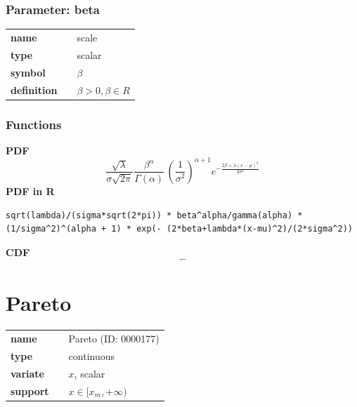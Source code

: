 \documentclass{article}
\begin{document}
\subsubsection*{Parameter: beta}

\noindent\begin{tabular}{p{2cm}cl}
\textbf{name} & & scale \\
\textbf{type} & & scalar \\
\textbf{symbol} & & $\beta$  \\
\textbf{definition} & & $\beta > 0, \beta \in  R$
\end{tabular}
\subsubsection*{Functions}

\smallskip \noindent \hspace{.2cm} \textbf{PDF} 
\begin{equation*}\frac {\sqrt{\lambda}} {\sigma\sqrt{2\pi} }  \frac{\beta^\alpha}{\Gamma(\alpha)} \, \left( \frac{1}{\sigma^2} \right)^{\alpha + 1}   e^{ -\frac { 2\beta + \lambda(x - \mu)^2} {2\sigma^2}  } \end{equation*}
\smallskip \noindent \hspace{.2cm} \textbf{PDF in R}  
\begin{verbatim}sqrt(lambda)/(sigma*sqrt(2*pi)) * beta^alpha/gamma(alpha) * (1/sigma^2)^(alpha + 1) * exp(- (2*beta+lambda*(x-mu)^2)/(2*sigma^2))\end{verbatim}
\smallskip \noindent \hspace{.2cm} \textbf{CDF} 
\begin{equation*}-\end{equation*}
\smallskip\section*{Pareto} 

  \bigskip 

\begin{tabular}{p{2cm}cl}
\textbf{name} & & Pareto (ID: 0000177)\\ 
 
\textbf{type} & & continuous \\ 

\textbf{variate} & & $x$, scalar \\ 

\textbf{support} & & $x \in [x_m, +\infty)$
\end{tabular}
\end{document}
